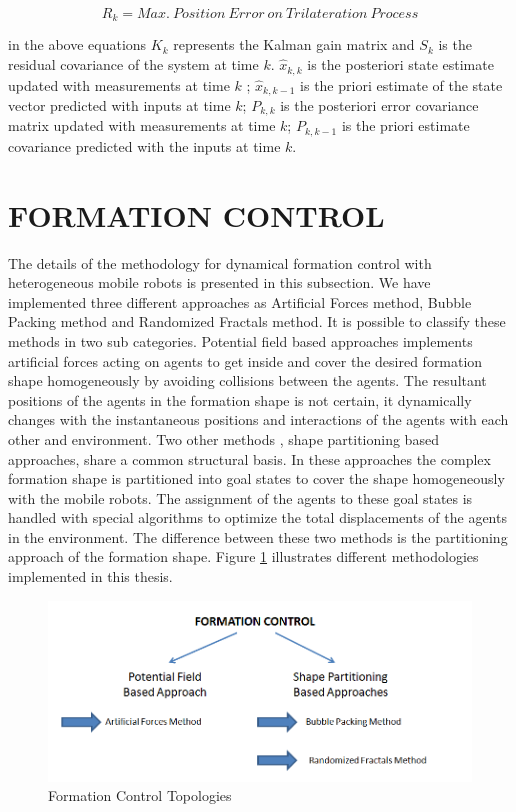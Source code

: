 \begin{equation}
R_k = Max.\ Position\ Error\ on\ Trilateration\ Process
\end{equation}
		
in the above equations $K_k$ represents the Kalman gain matrix and $S_k$ is the residual covariance of the system at time $k$. $\hat{x}_{k,k}$ is the posteriori state estimate updated with measurements at time $k$ ;  $\hat{x}_{k,k-1}$ is the priori estimate of the state vector predicted with inputs at time $k$; $P_{k,k}$ is the posteriori error covariance matrix updated with measurements at time $k$; $P_{k,k-1}$ is the priori estimate covariance predicted with the inputs at time $k$.
			
\section{FORMATION CONTROL} \label{formation_control_ref}
The details of the methodology for dynamical formation control with heterogeneous mobile robots is presented in this subsection. We have implemented three different approaches as Artificial Forces method, Bubble Packing method and Randomized Fractals method. It is possible to classify these methods in two sub categories. Potential field based approaches implements artificial forces acting on agents to get inside and cover the desired formation shape homogeneously by avoiding collisions between the agents. The resultant positions of the agents in the formation shape is not certain, it dynamically changes with the instantaneous positions and interactions of the agents with each other and environment. Two other methods , shape partitioning based approaches, share a common structural basis. In these approaches the complex formation shape is partitioned into goal states to cover the shape homogeneously with the mobile robots. The assignment of the agents to these goal states is handled with special algorithms to optimize the total displacements of the agents in the environment. The difference between these two methods is the partitioning approach of the formation shape. Figure \ref{formation_controlin_figi} illustrates different methodologies implemented in this thesis.
		
\begin{figure}[H]
\caption{Formation Control Topologies} \label{formation_controlin_figi}
\centering
\includegraphics[scale = 0.60]{methods}
\end{figure}		
		
